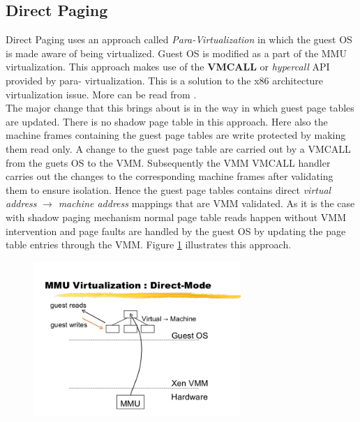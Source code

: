 \subsection{Direct Paging} \label{para}
Direct Paging uses an approach called \textit{Para-Virtualization} in which the guest OS
is made aware of being virtualized. Guest OS is modified as a part of the MMU virtualization. This
approach makes use of the \textbf{VMCALL} or \textit{hypercall} API provided by para-
virtualization. This is a solution to the x86 architecture virtualization issue. More
can be read from \citet{force2000analysis}.\\
The major change that this brings about is in the way in which guest page tables are updated.
There is no shadow page table in this approach. Here also the machine frames containing the guest
page tables are write protected by making them read only. A change to the guest page table are
carried out by a VMCALL from the guets OS to the VMM. Subsequently the VMM VMCALL handler carries
out the changes to the corresponding machine frames after validating them to ensure isolation.
Hence the guest page tables contains direct \textit{virtual address} $\rightarrow$ \textit{machine
address} mappings that are VMM validated. As it is the case with shadow paging mechanism
normal page table reads happen without VMM intervention and page faults are handled by the guest
OS by updating the page table entries through the VMM. Figure \ref{fig:para} illustrates this
approach.
\begin{figure}[tbp]
  \begin{center}
    \includegraphics[width=0.7\textwidth]{images/paravirt}
    \label{fig:para}
     \end{center}
\end{figure}
